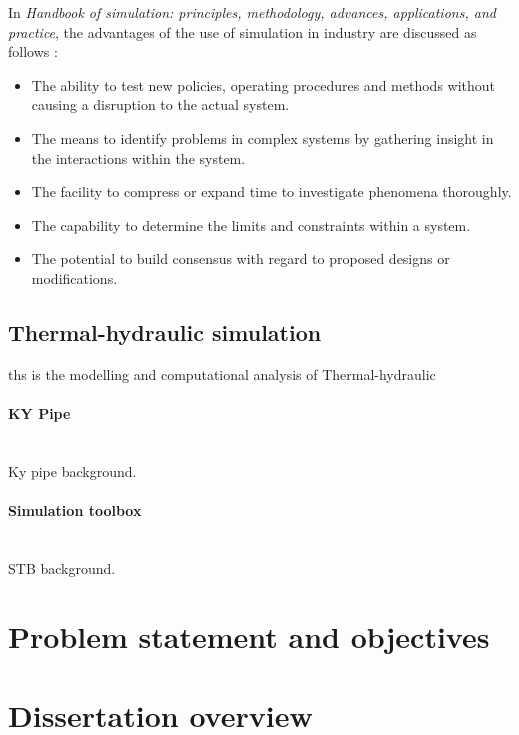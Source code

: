 In \textit{ Handbook of simulation: principles, methodology, advances, applications, and practice}, the advantages of the use of simulation in industry are discussed as follows \cite{banks1998handbook}: 
\begin{itemize}
	\item The ability to test new policies, operating procedures and methods without causing a disruption to the actual system.
	\item The means to identify problems in complex systems by gathering insight in the interactions within the system.
	\item The facility to compress or expand time to investigate phenomena thoroughly.
	\item The capability to determine the limits and constraints within a system.
	\item The potential to build consensus with regard to proposed designs or modifications.
\end{itemize}

\subsection{Thermal-hydraulic simulation}
\gls{ths} is the modelling and  computational analysis of Thermal-hydraulic
\paragraph{KY Pipe}\leavevmode\\
Ky pipe background. \cite{Wood1993KYPipe}
\paragraph{Simulation toolbox}\leavevmode\\
STB background.
\section{Problem statement and objectives}
\section{Dissertation overview}